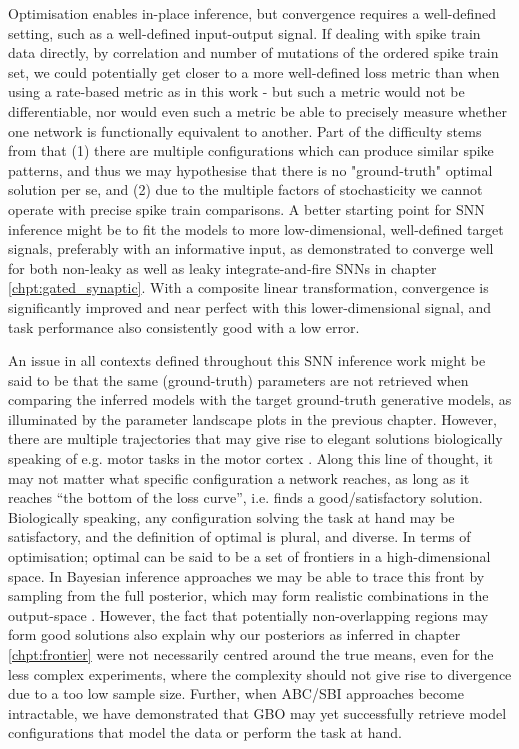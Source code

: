 \documentclass[mphil,deptreport,ianc]{infthesis} %
\begin{document}
Optimisation enables in-place inference, but convergence requires a well-defined setting, such as a well-defined input-output signal.
If dealing with spike train data directly, by correlation and number of mutations of the ordered spike train set, we could potentially get closer to a more well-defined loss metric than when using a rate-based metric as in this work - but such a metric would not be differentiable, nor would even such a metric be able to precisely measure whether one network is functionally equivalent to another.
Part of the difficulty stems from that (1) there are multiple configurations which can produce similar spike patterns, and thus we may hypothesise that there is no "ground-truth" optimal solution per se, and (2) due to the multiple factors of stochasticity we cannot operate with precise spike train comparisons. 
A better starting point for SNN inference might be to fit the models to more low-dimensional, well-defined target signals, preferably with an informative input, as demonstrated to converge well for both non-leaky as well as leaky integrate-and-fire SNNs in chapter \ref{chpt:gated_synaptic}.
With a composite linear transformation, convergence is significantly improved and near perfect with this lower-dimensional signal, and task performance also consistently good with a low error.

An issue in all contexts defined throughout this SNN inference work might be said to be that the same (ground-truth) parameters are not retrieved when comparing the inferred models with the target ground-truth generative models, as illuminated by the parameter landscape plots in the previous chapter.
However, there are multiple trajectories that may give rise to elegant solutions biologically speaking of e.g. motor tasks in the motor cortex \cite{Marblestone2016}.
Along this line of thought, it may not matter what specific configuration a network reaches, as long as it reaches “the bottom of the loss curve”, i.e. finds a good/satisfactory solution.
Biologically speaking, any configuration solving the task at hand may be satisfactory, and the definition of optimal is plural, and diverse. In terms of optimisation; optimal can be said to be a set of frontiers in a high-dimensional space.
In Bayesian inference approaches we may be able to trace this front by sampling from the full posterior, which may form realistic combinations in the output-space \cite{Lueckmann2017}. However, the fact that potentially non-overlapping regions may form good solutions also explain why our posteriors as inferred in chapter \ref{chpt:frontier} were not necessarily centred around the true means, even for the less complex experiments, where the complexity should not give rise to divergence due to a too low sample size.
Further, when ABC/SBI approaches become intractable, we have demonstrated that GBO may yet successfully retrieve model configurations that model the data or perform the task at hand.
\end{document}

